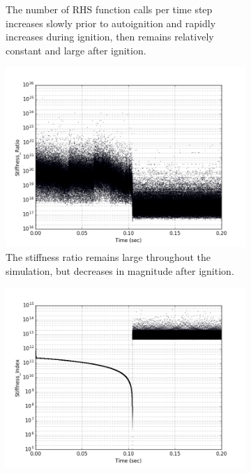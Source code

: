 \documentclass[12pt]{ussci}
\begin{document}
\begin{figure}[htbp]
\begin{subfigure}{0.42\textwidth}
        \caption{The number of RHS function calls per time step increases slowly prior to autoignition and rapidly increases during ignition, then remains relatively constant and large after ignition.}
        \label{fig:fnworkH2COAuto}
    \end{subfigure}
    \begin{subfigure}{0.42\textwidth}
        \includegraphics[width=\linewidth]{Autoignition_Stiffness_Ratio_1e-06_08_03.png}
        \caption{The stiffness ratio remains large throughout the simulation, but decreases in magnitude after ignition.}
        \label{fig:SRH2COAuto}
    \end{subfigure}
    \hfill
    \begin{subfigure}{0.42\textwidth}
        \includegraphics[width=\linewidth]{Autoignition_Stiffness_Index_1e-06_08_03.png}

\end{subfigure}
\end{figure}
\end{document}
